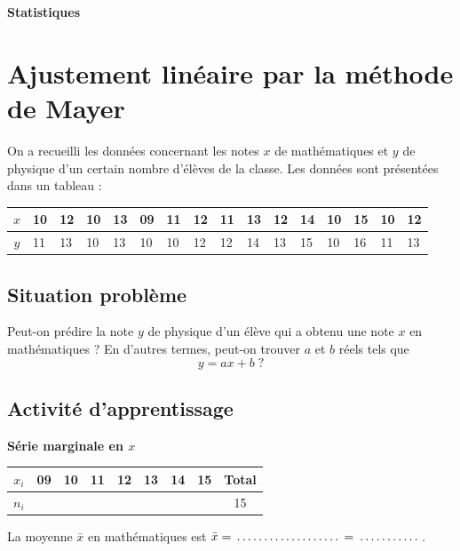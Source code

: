 \documentclass[11pt,a4paper]{article}
\newcommand{\blanc}[1][1.8cm]{\makebox[#1]{\dotfill}}
\newcommand{\rubrique}[1]{\par\medskip\noindent\textbf{#1}\par\smallskip}
\begin{document}
\begin{center}
  {\LARGE\bfseries Statistiques}
\end{center}

\section{Ajustement linéaire par la méthode de Mayer}

On a recueilli les données concernant les notes $x$ de mathématiques et $y$ de
physique d'un certain nombre d'élèves de la classe. Les données sont présentées
dans un tableau :

\begin{center}
  \small\setlength{\tabcolsep}{3pt}
  \begin{tabular}{|c|*{15}{C{0.62cm}|}}
    \hline
    $x$ & 10 & 12 & 10 & 13 & 09 & 11 & 12 & 11 & 13 & 12 & 14 & 10 & 15 & 10 & 12\\ \hline
    $y$ & 11 & 13 & 10 & 13 & 10 & 10 & 12 & 12 & 14 & 13 & 15 & 10 & 16 & 11 & 13\\ \hline
  \end{tabular}
\end{center}

\subsection{Situation problème}

Peut-on prédire la note $y$ de physique d'un élève qui a obtenu une note $x$ en
mathématiques ? En d'autres termes, peut-on trouver $a$ et $b$ réels tels que
\[
  y = ax + b \;?
\]

\subsection{Activité d'apprentissage}

\rubrique{Série marginale en $x$}

\begin{center}
  \begin{tabular}{|c|*{7}{C{0.8cm}|}c|}
    \hline
    $x_i$ & 09 & 10 & 11 & 12 & 13 & 14 & 15 & Total\\ \hline
    $n_i$ & & & & & & & & 15\\ \hline
  \end{tabular}
\end{center}
La moyenne $\bar{x}$ en mathématiques est
$\bar{x} = \blanc[3cm] = \blanc$.
\end{document}
